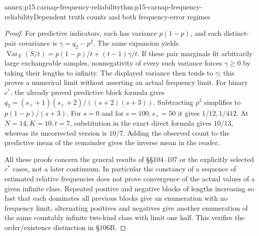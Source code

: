 \begin{annexitem}{annex:p15.carnap-frequency-reliability}{thm:p15-carnap-frequency-reliability}{Dependent truth counts and both frequency-error regimes}
\begin{proof}
For predictive indicators, each has variance \(p(1-p)\), and
each distinct-pair covariance is \(\gamma=q_2-p^2\).
The same expansion yields
\(\operatorname{Var}_E(S/t)=p(1-p)/t+(t-1)\gamma/t\).
If these pair marginals fit arbitrarily large exchangeable samples,
nonnegativity of every such variance forces \(\gamma\geq0\)
by taking their lengths to infinity. The displayed variance then
tends to \(\gamma\); this proves a numerical limit without
asserting an actual frequency limit. For binary \(c^*\), the
already proved predictive block formula gives
\(q_2=(s_++1)(s_++2)/((s+2)(s+3))\).
Subtracting \(p^2\) simplifies to \(p(1-p)/(s+3)\).
For \(s=0\) and for \(s=100,s_+=50\) it gives
\(1/12,1/412\). At \(N=14,K=10,t=7\), substitution in
the exact direct formula gives \(10/13\), whereas its uncorrected
version is \(10/7\). Adding the observed count to the predictive
mean of the remainder gives the inverse mean in the reader.

All these proofs concern the general results of §§104--107 or the
explicitly selected \(c^*\) cases, not a later continuum. In
particular the constancy of a sequence of estimated relative frequencies
does not prove convergence of the actual values of a given infinite
class. Repeated positive and negative blocks of lengths increasing so
fast that each dominates all previous blocks give an enumeration with
no frequency limit; alternating positives and negatives give another
enumeration of the same countably infinite two-kind class with limit
one half. This verifies the order/existence distinction in §106B.
\end{proof}
\end{annexitem}
